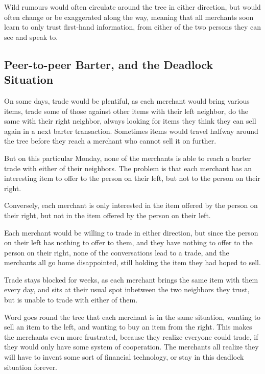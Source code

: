 \documentclass[11pt,twoside,a4paper]{article}
\begin{document}
Wild rumours would often circulate around the tree in either direction, but would often change or be exaggerated along the way, meaning that all merchants soon learn to only trust first-hand information, from either of the two persons they can see and speak to.

\subsection{Peer-to-peer Barter, and the Deadlock Situation}
On some days, trade would be plentiful, as each merchant would bring various items, trade some of those against other items with their left neighbor, do the same with their right neighbor, always looking for items they think they can sell again in a next barter transaction. Sometimes items would travel halfway around the tree before they reach a merchant who cannot sell it on further.

But on this particular Monday, none of the merchants is able to reach a barter trade with either of their neighbors. The problem is that each merchant has an interesting item to offer to the person on their left, but not to the person on their right.

Conversely, each merchant is only interested in the item offered by the person on their right, but not in the item offered by the person on their left.

Each merchant would be willing to trade in either direction, but since the person on their left has nothing to offer to them, and they have nothing to offer to the person on their right, none of the conversations lead to a trade, and the merchants all go home disappointed, still holding the item they had hoped to sell.

Trade stays blocked for weeks, as each merchant brings the same item with them every day, and sits at their usual spot inbetween the two neighbors they trust, but is unable to trade with either of them.

Word goes round the tree that each merchant is in the same situation, wanting to sell an item to the left, and wanting to buy an item from the right. This makes the merchants even more frustrated, because they realize everyone could trade, if they would only have some system of cooperation. The merchants all realize they will have to invent some sort of financial technology, or stay in this deadlock situation forever.
\end{document}
